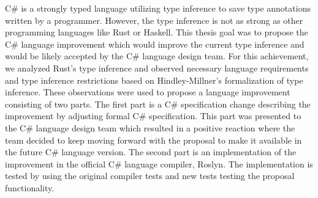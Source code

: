\documentclass[12pt]{report}
\begin{document}

C\# is a strongly typed language utilizing type inference to save type annotations written by a programmer. 
However, the type inference is not as strong as other programming languages like Rust or Haskell.
This thesis goal was to propose the C\# language improvement which would improve the current type inference and would be likely accepted by the C\# language design team. For this achievement, we analyzed Rust's type inference and observed necessary language requirements and type inference restrictions based on Hindley-Millner's formalization of type inference. 
These observations were used to propose a language improvement consisting of two parts. 
The first part is a C\# specification change describing the improvement by adjusting formal C\# specification. 
This part was presented to the C\# language design team which resulted in a positive reaction where the team decided to keep moving forward with the proposal to make it available in the future C\# language version. 
The second part is an implementation of the improvement in the official C\# language compiler, Roslyn. 
The implementation is tested by using the original compiler tests and new tests testing the proposal functionality.
\end{document}
